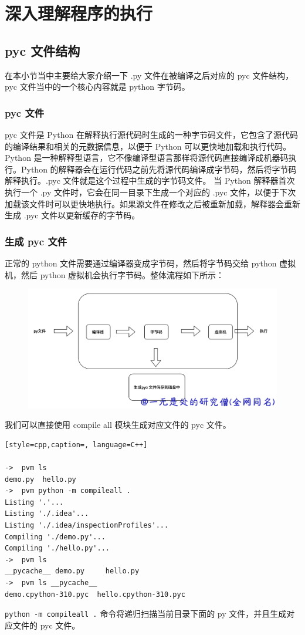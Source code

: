 \chapter{深入理解程序的执行}
\section{pyc 文件结构}
在本小节当中主要给大家介绍一下 .py 文件在被编译之后对应的 pyc 文件结构，pyc 文件当中的一个核心内容就是 python 字节码。
\subsection{pyc 文件}
pyc 文件是 Python 在解释执行源代码时生成的一种字节码文件，它包含了源代码的编译结果和相关的元数据信息，以便于 Python 可以更快地加载和执行代码。
Python 是一种解释型语言，它不像编译型语言那样将源代码直接编译成机器码执行。Python 的解释器会在运行代码之前先将源代码编译成字节码，然后将字节码解释执行。.pyc 文件就是这个过程中生成的字节码文件。
当 Python 解释器首次执行一个 .py 文件时，它会在同一目录下生成一个对应的 .pyc 文件，以便于下次加载该文件时可以更快地执行。如果源文件在修改之后被重新加载，解释器会重新生成 .pyc 文件以更新缓存的字节码。
\subsection{生成 pyc 文件}
正常的 python 文件需要通过编译器变成字节码，然后将字节码交给 python 虚拟机，然后 python 虚拟机会执行字节码。整体流程如下所示：

    \begin{figure}[H]
        \centering
            \includegraphics[scale=.25]{images/35-pyc.png}
						\caption{ }
        \label{fig:my_label}
    \end{figure}
    
我们可以直接使用 compile all 模块生成对应文件的 pyc 文件。
\begin{lstlisting}[style=cpp,caption=, language=C++]

->  pvm ls
demo.py  hello.py
->  pvm python -m compileall .
Listing '.'...
Listing './.idea'...
Listing './.idea/inspectionProfiles'...
Compiling './demo.py'...
Compiling './hello.py'...
->  pvm ls
__pycache__ demo.py     hello.py
->  pvm ls __pycache__ 
demo.cpython-310.pyc  hello.cpython-310.pyc
\end{lstlisting}
\verb|python -m compileall .| 命令将递归扫描当前目录下面的 py 文件，并且生成对应文件的 pyc 文件。
